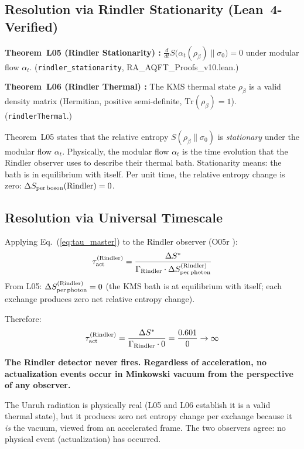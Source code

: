 \documentclass[12pt,a4paper]{article}
\begin{document}
\subsection{Resolution via Rindler Stationarity (Lean~4-Verified)}

\begin{leanbox}
\textbf{Theorem~L05 (Rindler Stationarity) \statusLV:}
$\displaystyle\frac{d}{dt}S\!\bigl(\alpha_t(\rho_\beta)\|\sigma_0\bigr) = 0$
under modular flow $\alpha_t$.  (\texttt{rindler\_stationarity}, RA\_AQFT\_Proofs\_v10.lean.)

\textbf{Theorem~L06 (Rindler Thermal) \statusLV:}
The KMS thermal state $\rho_\beta$ is a valid density matrix (Hermitian, positive semi-definite, $\mathrm{Tr}(\rho_\beta)=1$).  (\texttt{rindlerThermal}.)
\end{leanbox}

Theorem~L05 states that the relative entropy $S(\rho_\beta\|\sigma_0)$ is \emph{stationary} under the modular flow $\alpha_t$.  Physically, the modular flow $\alpha_t$ is the time evolution that the Rindler observer uses to describe their thermal bath.  Stationarity means: the bath is in equilibrium with itself.  Per unit time, the relative entropy change is zero: $\Delta S_{\rm per\,boson}(\text{Rindler}) = 0$.

\subsection{Resolution via Universal Timescale}

Applying Eq.~(\ref{eq:tau_master}) to the Rindler observer (O05r \statusDR):
\begin{equation}
  \tau_{\rm act}^{(\text{Rindler})} = \frac{\Delta S^*}{\Gamma_{\rm Rindler}\cdot\Delta S_{\rm per\,photon}^{(\text{Rindler})}}
\end{equation}
From L05: $\Delta S_{\rm per\,photon}^{(\text{Rindler})} = 0$ (the KMS bath is at equilibrium with itself; each exchange produces zero net relative entropy change).

Therefore:
\begin{equation}
  \tau_{\rm act}^{(\text{Rindler})} = \frac{\Delta S^*}{\Gamma_{\rm Rindler}\cdot0} = \frac{0.601}{0} \to \infty
\end{equation}

\textbf{The Rindler detector never fires.  Regardless of acceleration, no actualization events occur in Minkowski vacuum from the perspective of any observer.}

The Unruh radiation is physically real (L05 and L06 establish it is a valid thermal state), but it produces zero net entropy change per exchange because it \emph{is} the vacuum, viewed from an accelerated frame.  The two observers agree: no physical event (actualization) has occurred.
\end{document}

